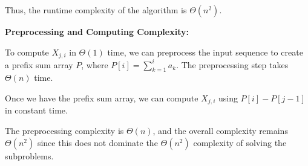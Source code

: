 \begin{parts}
\begin{solution}
        Thus, the runtime complexity of the algorithm is $\Theta(n^2)$.
                
        \pagebreak
        
        \textbf{Preprocessing and Computing Complexity:}

        To compute $X_{j,i}$ in $\Theta(1)$ time, we can preprocess the input sequence to create a prefix sum array $P$, where $P[i] = \sum_{k=1}^{i} a_k$. The preprocessing step takes $\Theta(n)$ time.

        Once we have the prefix sum array, we can compute $X_{j,i}$ using $P[i] - P[j-1]$ in constant time.

        The preprocessing complexity is $\Theta(n)$, and the overall complexity remains $\Theta(n^2)$ since this does not dominate the $\Theta(n^2)$ complexity of solving the subproblems.
    \end{solution}
\end{parts}



